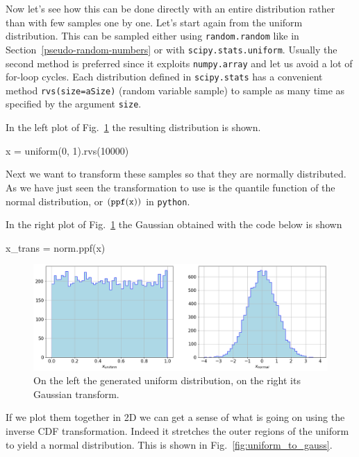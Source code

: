Now let's see how this can be done directly with an entire distribution rather than with few samples one by one. Let's start again from the uniform distribution. This can be sampled either using \texttt{random.random} like in Section~\ref{pseudo-random-numbers} or with \texttt{scipy.stats.uniform}. Usually the second method is preferred since it exploits \texttt{numpy.array} and let us avoid a lot of for-loop cycles. 
Each distribution defined in \texttt{scipy.stats} has a convenient method \texttt{rvs(size=aSize)} (random variable sample) to sample as many time as specified by the argument \texttt{size}. 

In the left plot of Fig.~\ref{fig:uniform_and_gauss} the resulting distribution is shown.

\begin{ipython}
x = uniform(0, 1).rvs(10000)
\end{ipython}

Next we want to transform these samples so that they are normally distributed. As we have just seen the transformation to use is the quantile function of the normal distribution, or $(\tt{ppf(x))}$ in \texttt{python}. %

In the right plot of Fig.~\ref{fig:uniform_and_gauss} the Gaussian obtained with the code below is shown

\begin{ipython}
x_trans = norm.ppf(x)
\end{ipython}

\begin{figure}[htb]
\centering
\includegraphics[width=1.\textwidth]{figures/uniform_gauss}
\caption{On the left the generated uniform distribution, on the right its Gaussian transform.}
\label{fig:uniform_and_gauss}
\end{figure}

If we plot them together in 2D we can get a sense of what is going on using the inverse CDF transformation. Indeed it stretches the outer regions of the uniform to yield a normal distribution. This is shown in Fig.~\ref{fig:uniform_to_gauss}. 
    
